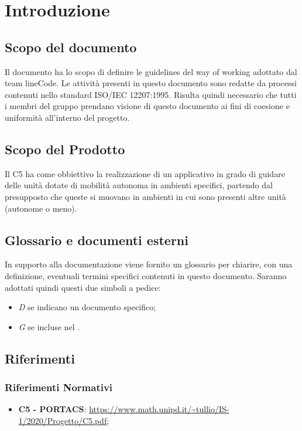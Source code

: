 \documentclass[]{article}
\begin{document}
	
	\newpage
	\section{Introduzione}
		\subsection{Scopo del documento}
		Il documento ha lo scopo di definire le guidelines del way of working adottato dal team lineCode. Le attività presenti in questo documento sono redatte da processi contenuti nello standard ISO/IEC 12207:1995. Risulta quindi necessario che tutti i membri del gruppo prendano visione di questo documento ai fini di coesione e uniformità all'interno del progetto.

		\subsection{Scopo del Prodotto}
		Il  C5 ha come obbiettivo la realizzazione di un applicativo  in grado di guidare delle unità dotate di mobilità autonoma in ambienti specifici, partendo dal presupposto che queste si muovano in ambienti in cui sono presenti altre unità (autonome o meno).

		\subsection{Glossario e documenti esterni}
		In supporto alla documentazione viene fornito un glossario per chiarire, con una definizione, eventuali termini specifici contenuti in questo documento.
		Saranno adottati quindi questi due simboli a pedice:
		\begin{itemize}
			\item \textit{D} se indicano un documento specifico;
			\item \textit{G} se incluse nel .
		\end{itemize}

		\subsection{Riferimenti}
			\subsubsection{Riferimenti Normativi}
			\begin{itemize}
				\item \textbf{{ C5 - PORTACS}}: \url{https://www.math.unipd.it/~tullio/IS-1/2020/Progetto/C5.pdf};
			\end{itemize}
\end{document}
